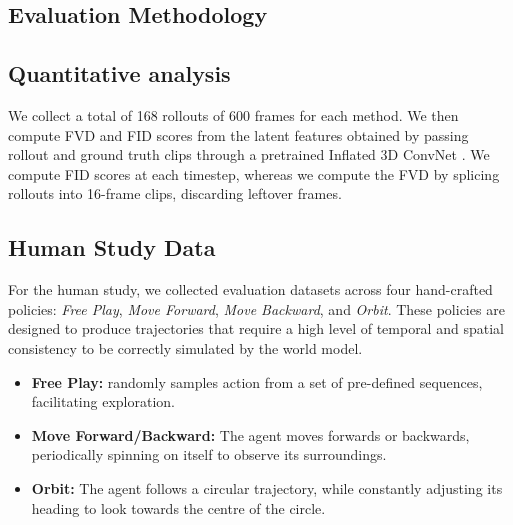 \begin{subappendices}
\section{Evaluation Methodology}\label{c4:app:data_met}


\subsection{Quantitative analysis}

We collect a total of 168 rollouts of 600 frames for each method. We then compute FVD and FID scores from the latent features obtained by passing rollout and ground truth clips through a pretrained Inflated 3D ConvNet \citep{carreira2017quo}. We compute FID scores at each timestep, whereas we compute the FVD by splicing rollouts into 16-frame clips, discarding leftover frames.

\subsection{Human Study Data}

For the human study, we collected evaluation datasets across four hand-crafted policies: \textit{Free Play}, \textit{Move Forward}, \textit{Move Backward}, and \textit{Orbit}.
These policies are designed to produce trajectories that require a high level of temporal and spatial consistency to be correctly simulated by the world model.

\begin{itemize}
    \item \textbf{Free Play:} randomly samples action from a set of pre-defined sequences, facilitating exploration.
    \item \textbf{Move Forward/Backward:} The agent moves forwards or backwards, periodically spinning on itself to observe its surroundings.
    \item \textbf{Orbit:} The agent follows a circular trajectory, while constantly adjusting its heading to look towards the centre of the circle.
\end{itemize}


\end{subappendices}
